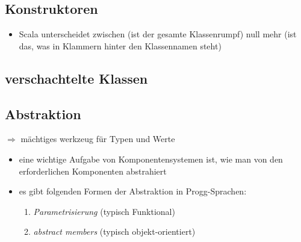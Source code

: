 \subsection{Konstruktoren}
\begin{itemize}
  \item Scala unterscheidet zwischen  (ist der gesamte Klassenrumpf) \und null \oder mehr  (ist das, was in Klammern hinter den Klassennamen steht)
  
  
\end{itemize}


\subsection{verschachtelte Klassen}



\subsection{Abstraktion}
$\Rightarrow$ mächtiges werkzeug für Typen und Werte


\begin{itemize}
  \item eine wichtige Aufgabe von Komponentensystemen ist, wie man von den
  erforderlichen Komponenten abstrahiert
  \item es gibt folgenden Formen der Abstraktion in Progg-Sprachen:
  \begin{enumerate}
    \item \textit{Parametrisierung} (typisch Funktional)
    \item \textit{abstract members} (typisch objekt-orientiert)
  \end{enumerate}
\end{itemize}




